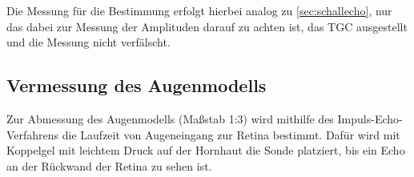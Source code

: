 Die Messung für die Bestimmung erfolgt hierbei analog zu \autoref{sec:schallecho}, 
nur das dabei zur Messung der Amplituden darauf zu achten ist, das TGC ausgestellt und die Messung nicht verfälscht.


\subsection{Vermessung des Augenmodells}

Zur Abmessung des Augenmodells (Maßstab 1:3) wird mithilfe des Impuls-Echo-Verfahrens die Laufzeit von Augeneingang zur Retina bestimmt.
Dafür wird mit Koppelgel mit leichtem Druck auf der Hornhaut die Sonde platziert, bis ein Echo an der Rückwand der Retina zu sehen ist.
